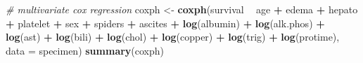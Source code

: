 \documentclass[]{article}
\newenvironment{Shaded}{\begin{snugshade}}{\end{snugshade}}
\newcommand{\KeywordTok}[1]{\textcolor[rgb]{0.13,0.29,0.53}{\textbf{#1}}}
\newcommand{\DataTypeTok}[1]{\textcolor[rgb]{0.13,0.29,0.53}{#1}}
\newcommand{\StringTok}[1]{\textcolor[rgb]{0.31,0.60,0.02}{#1}}
\newcommand{\CommentTok}[1]{\textcolor[rgb]{0.56,0.35,0.01}{\textit{#1}}}
\newcommand{\OperatorTok}[1]{\textcolor[rgb]{0.81,0.36,0.00}{\textbf{#1}}}
\newcommand{\NormalTok}[1]{#1}
\begin{document}
\begin{Shaded}
\begin{Highlighting}[]
\CommentTok{# multivariate cox regression}
\NormalTok{coxph <-}\StringTok{ }\KeywordTok{coxph}\NormalTok{(survival  }\OperatorTok{~}\StringTok{ }\NormalTok{age }\OperatorTok{+}\StringTok{ }\NormalTok{edema }\OperatorTok{+}\StringTok{ }\NormalTok{hepato }\OperatorTok{+}\StringTok{ }\NormalTok{platelet }\OperatorTok{+}\StringTok{ }\NormalTok{sex }\OperatorTok{+}\StringTok{ }\NormalTok{spiders }\OperatorTok{+}\StringTok{ }\NormalTok{ascites }\OperatorTok{+}\StringTok{ }\KeywordTok{log}\NormalTok{(albumin) }\OperatorTok{+}\StringTok{ }\KeywordTok{log}\NormalTok{(alk.phos) }\OperatorTok{+}\StringTok{ }\KeywordTok{log}\NormalTok{(ast) }\OperatorTok{+}\StringTok{ }\KeywordTok{log}\NormalTok{(bili) }\OperatorTok{+}\StringTok{ }\KeywordTok{log}\NormalTok{(chol) }\OperatorTok{+}\StringTok{ }\KeywordTok{log}\NormalTok{(copper) }\OperatorTok{+}\StringTok{ }\KeywordTok{log}\NormalTok{(trig) }\OperatorTok{+}\StringTok{ }\KeywordTok{log}\NormalTok{(protime), }\DataTypeTok{data =}\NormalTok{ specimen)}
\KeywordTok{summary}\NormalTok{(coxph)}
\end{Highlighting}
\end{Shaded}
\end{document}

